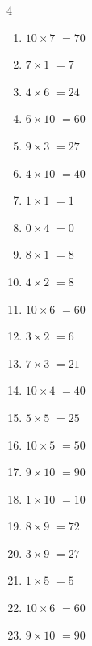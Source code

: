\begin{multicols}{4}
\begin{enumerate}
  \item $10\times 7$
        $=70$

  \item $7\times 1$
        $=7$

  \item $4\times 6$
        $=24$

  \item $6\times 10$
        $=60$

  \item $9\times 3$
        $=27$

  \item $4\times 10$
        $=40$

  \item $1\times 1$
        $=1$

  \item $0\times 4$
        $=0$

\columnbreak %

  \item $8\times 1$
        $=8$

  \item $4\times 2$
        $=8$

  \item $10\times 6$
        $=60$

  \item $3\times 2$
        $=6$

  \item $7\times 3$
        $=21$

  \item $10\times 4$
        $=40$

  \item $5\times 5$
        $=25$

  \item $10\times 5$
        $=50$

  \item $9\times 10$
        $=90$

  \item $1\times 10$
        $=10$

  \item $8\times 9$
        $=72$

  \item $3\times 9$
        $=27$

  \item $1\times 5$
        $=5$

  \item $10\times 6$
        $=60$

  \item $9\times 10$
        $=90$


\end{enumerate}
\end{multicols}
